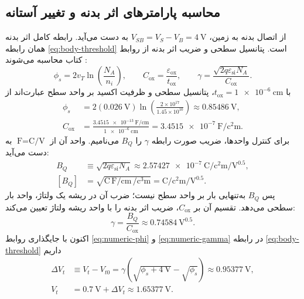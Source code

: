 \subsection*{محاسبه پارامترهای اثر بدنه و تغییر آستانه}
از اتصال بدنه به زمین، \(V_{SB}=V_S-V_B=\qty{4}{\volt}\) به دست می‌آید.
رابطه کامل اثر بدنه همان رابطه \eqref{eq:body-threshold} است.
پتانسیل سطحی و ضریب اثر بدنه از روابط کتاب محاسبه می‌شوند
\cite[روابط  و ]{weste}\cite[اسلایدهای ۱۶ و ۱۷]{nonideal}:
\begin{equation}
 \phi_s=2v_T\ln\!\left(\frac{N_A}{n_i}\right),\qquad
 C_{\mathrm{ox}}=\frac{\varepsilon_{\mathrm{ox}}}{t_{\mathrm{ox}}},\qquad
 \gamma=\frac{\sqrt{2q\varepsilon_{\mathrm{si}}N_A}}{C_{\mathrm{ox}}}.
 \label{eq:numeric-body-parameters}
\end{equation}
با \(t_{\mathrm{ox}}=\qty{1e-6}{\centi\metre}\)، پتانسیل سطحی و ظرفیت اکسید بر واحد سطح عبارت‌اند از
\begin{align}
 \phi_s&=2(\qty{0.026}{\volt})
 \ln\!\left(\frac{2\times10^{17}}{1.45\times10^{10}}\right)
 \approx\qty{0.85486}{\volt},\label{eq:numeric-phi}\\
 C_{\mathrm{ox}}&=\frac{\qty{3.4515e-13}{\farad\per\centi\metre}}
 {\qty{1e-6}{\centi\metre}}
 =\qty{3.4515e-7}{\farad\per\square\centi\metre}.
 \label{eq:numeric-cox}
\end{align}
برای کنترل واحدها، ضریب صورت رابطه \(\gamma\) را \(B_Q\) می‌نامیم.
واحد آن از \(\unit{\farad}=\unit{\coulomb\per\volt}\) به دست می‌آید:
\begin{align}
 B_Q&\equiv\sqrt{2q\varepsilon_{\mathrm{si}}N_A}
 \approx\qty{2.57427e-7}{\coulomb\per\square\centi\metre\per\volt\tothe{0.5}},
 \label{eq:numeric-charge-coefficient}\\
 [B_Q]&=\sqrt{\unit{\coulomb}\,
 \unit{\farad\per\centi\metre}\,
 \unit{\per\cubic\centi\metre}}
 =\unit{\coulomb\per\square\centi\metre\per\volt\tothe{0.5}}.
 \label{eq:numeric-dimension}
\end{align}
پس \(B_Q\) به‌تنهایی بار بر واحد سطح نیست؛ ضرب آن در ریشه یک ولتاژ، واحد بار سطحی می‌دهد.
تقسیم آن بر \(C_{\mathrm{ox}}\)، ضریب اثر بدنه را با واحد ریشه ولتاژ تعیین می‌کند:
\begin{equation}
 \gamma=\frac{B_Q}{C_{\mathrm{ox}}}
 \approx\qty{0.74584}{\volt\tothe{0.5}}.
 \label{eq:numeric-gamma}
\end{equation}
اکنون با جایگذاری روابط \eqref{eq:numeric-phi} و \eqref{eq:numeric-gamma} در رابطه \eqref{eq:body-threshold} داریم
\begin{align}
 \Delta V_t&\equiv V_t-V_{t0}
 =\gamma\left(\sqrt{\phi_s+\qty{4}{\volt}}-\sqrt{\phi_s}\right)
 \approx\qty{0.95377}{\volt},\label{eq:numeric-threshold-shift}\\
 V_t&=\qty{0.7}{\volt}+\Delta V_t
 \approx\qty{1.65377}{\volt}.
 \label{eq:numeric-threshold-new}
\end{align}
